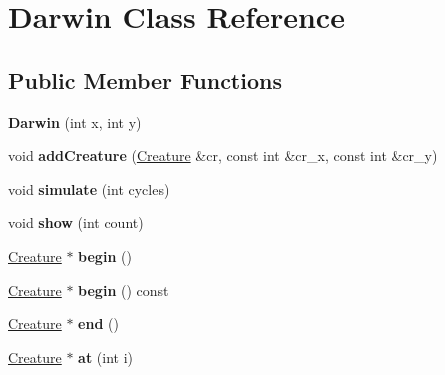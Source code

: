 \hypertarget{class_darwin}{\section{Darwin Class Reference}
\label{class_darwin}
}
\subsection*{Public Member Functions}
\begin{DoxyCompactItemize}
\item 
\hypertarget{class_darwin_ab19aeb32fa31eee1f42c38b18aa14673}{{\bfseries Darwin} (int x, int y)}\label{class_darwin_ab19aeb32fa31eee1f42c38b18aa14673}

\item 
\hypertarget{class_darwin_a5fda17db6ff7e9bbea7133d3a47bf267}{void {\bfseries add\-Creature} (\hyperlink{class_creature}{Creature} \&cr, const int \&cr\-\_\-x, const int \&cr\-\_\-y)}\label{class_darwin_a5fda17db6ff7e9bbea7133d3a47bf267}

\item 
\hypertarget{class_darwin_a9ac882a9e2d2e9bfa5a1510741693746}{void {\bfseries simulate} (int cycles)}\label{class_darwin_a9ac882a9e2d2e9bfa5a1510741693746}

\item 
\hypertarget{class_darwin_a25f210d99f8e27b9bae0c80a43eb3a2a}{void {\bfseries show} (int count)}\label{class_darwin_a25f210d99f8e27b9bae0c80a43eb3a2a}

\item 
\hypertarget{class_darwin_aa2c4db67b63ce31092000d461a5d8fe0}{\hyperlink{class_creature}{Creature} $\ast$ {\bfseries begin} ()}\label{class_darwin_aa2c4db67b63ce31092000d461a5d8fe0}

\item 
\hypertarget{class_darwin_a089abeaf6e933972d0d6719fd1cead03}{\hyperlink{class_creature}{Creature} $\ast$ {\bfseries begin} () const }\label{class_darwin_a089abeaf6e933972d0d6719fd1cead03}

\item 
\hypertarget{class_darwin_a685a8e15472b1b1394b99f51ec08f009}{\hyperlink{class_creature}{Creature} $\ast$ {\bfseries end} ()}\label{class_darwin_a685a8e15472b1b1394b99f51ec08f009}

\item 
\hypertarget{class_darwin_a43a7b774b039a9eac6c8e5aa280adfc9}{\hyperlink{class_creature}{Creature} $\ast$ {\bfseries at} (int i)}\label{class_darwin_a43a7b774b039a9eac6c8e5aa280adfc9}


\end{DoxyCompactItemize}
